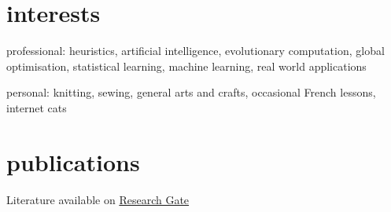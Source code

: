 \documentclass[]{cv} %
\begin{document}
\section{interests}
{\boldfont professional:} heuristics, artificial intelligence, evolutionary 
computation, global optimisation, statistical learning, machine learning,  real 
world applications 

{\boldfont personal:} knitting, sewing, general arts and crafts, occasional 
French lessons, internet cats

\clearpage
\section{publications}

{Literature available on 
\href{https://www.researchgate.net/profile/Helga_Ingimundardottir}{{\boldfont 
Research Gate}}}
\nocite{*}
\vspace{-6pt} %





\printbibliography[type=misc, title={seminars}, heading=subbibliography]


\end{document}
